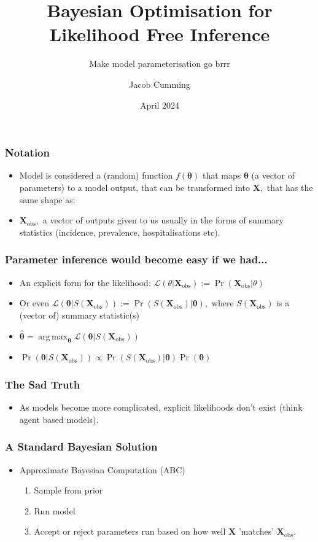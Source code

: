 \documentclass{beamer}
\title[BOLFI]{Bayesian Optimisation for Likelihood Free Inference}
\subtitle{Make model parameterisation go brrr}
\author{Jacob Cumming}
\institute{University of Melbourne}
\date{April 2024}
\DeclareMathOperator*{\argmax}{arg\,max}
\begin{document}
\frame{\titlepage}

\begin{frame}
    \frametitle{Notation}
    \begin{itemize}
        \item Model is considered a (random) function $f(\bm{\theta})$ that maps $\bm{\theta}$ (a vector of parameters) to a model output, that can be transformed into $\mathbf{X},$ that has the same shape as:
        \item $\mathbf{X}_\text{obs},$ a vector of outputs given to us usually in the forms of summary statistics (incidence, prevalence, hospitalisations etc).
    \end{itemize}
\end{frame}

\begin{frame}
    \frametitle{Parameter inference would become easy if we had...}
    \begin{itemize}
        \item An explicit form for the likelihood: $\mathcal{L}({\theta}|\mathbf{X}_\text{obs}) := \Pr(\mathbf{X}_\text{obs} | \theta)$
        \item <2-> Or even $\mathcal{L}(\bm{\theta}|S(\mathbf{X}_\text{obs})) := \Pr(S(\mathbf{X}_\text{obs}) | \bm\theta),$ where $S(\mathbf{X}_\text{obs})$ is a (vector of) summary statistic(s)
        \item <3-> $\hat{\bm{\theta}} = \argmax_{\bm{\theta}} \mathcal{L}(\bm{\theta}|S(\mathbf{X}_\text{obs}))$
        \item <4-> $\Pr(\bm{\theta}|S(\mathbf{X}_\text{obs})) \propto \Pr(S(\mathbf{X}_\text{obs})| \bm\theta)\Pr(\bm{\theta})$
    \end{itemize}
\end{frame}

\begin{frame}
    \frametitle{The Sad Truth}
    \begin{itemize}
        \item As models become more complicated, explicit likelihoods don't exist (think agent based models).
    \end{itemize}
\end{frame}

\begin{frame}
    \frametitle{A Standard Bayesian Solution}
    \begin{itemize}
        \item Approximate Bayesian Computation (ABC)\begin{enumerate}
                  \item Sample from prior
                  \item Run model
                  \item Accept or reject parameters run based on how well $\mathbf{X}$ 'matches' $\mathbf{X}_\text{obs}.$
              \end{enumerate}
    \end{itemize}
\end{frame}
\end{document}
